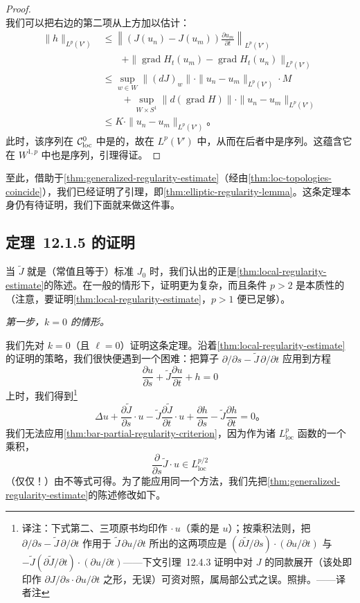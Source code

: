 \begin{proof}
\[\]
我们可以把右边的第二项从上方加以估计：
\[
\begin{aligned}
\|h\|_{L^{p}(V')}&\le\left\|(J(u_{n})-J(u_{m}))\frac{\partial u_{m}}{\partial t}\right\|_{L^{p}(V')}\\
&\qquad+\|\operatorname{grad}H_{t}(u_{m})-\operatorname{grad}H_{t}(u_{n})\|_{L^{p}(V')}\\
&\le\sup_{w\in W}\|(dJ)_{w}\|\cdot\|u_{n}-u_{m}\|_{L^{p}(V')}\cdot M\\
&\qquad+\sup_{W\times S^{1}}\|d(\operatorname{grad}H)\|\cdot\|u_{n}-u_{m}\|_{L^{p}(V')}\\
&\le K\cdot\|u_{n}-u_{m}\|_{L^{p}(V')}\text{。}
\end{aligned}
\]
此时，该序列在 $\mathcal{C}^{0}_{\mathrm{loc}}$ 中是\trConvergence{}的，故在 $L^{p}(V')$ 中\trConvergence，从而在后者中是\trCauchy{}序列。这蕴含它在 $W^{1,p}$ 中也是\trCauchy{}序列，引理得证。
\end{proof}

至此，借助于\cref{thm:generalized-regularity-estimate}（经由\cref{thm:loc-topologies-coincide}），我们已经证明了\trRegularity{}引理，即\cref{thm:elliptic-regularity-lemma}。这条定理本身仍有待证明，我们下面就来做这件事。

\subsection{定理~12.1.5 的证明}
\label{subsec:proof-thm-1215}

当 $\widetilde{J}$ 就是（常值且等于）标准\trComplexStructure{} $J_{0}$ 时，我们认出的正是\cref{thm:local-regularity-estimate}的陈述。在一般的情形下，证明更为复杂，而且条件 $p>2$ 是本质性的（注意，要证明\cref{thm:local-regularity-estimate}，$p>1$ 便已足够）。

\emph{第一步，$k=0$ 的情形。}

我们先对 $k=0$（且 $\ell=0$）证明这条定理。沿着\cref{thm:local-regularity-estimate}的证明的策略，我们很快便遇到一个困难：把算子 $\partial/\partial s-\widetilde{J}\,\partial/\partial t$ 应用到方程
\[
\frac{\partial u}{\partial s}+\widetilde{J}\frac{\partial u}{\partial t}+h=0
\]
上时，我们得到\footnote{译注：下式第二、三项原书均印作 $\cdot\,u$（乘的是 $u$）；按乘积法则，把 $\partial/\partial s-\widetilde{J}\,\partial/\partial t$ 作用于 $\widetilde{J}\,\partial u/\partial t$ 所出的这两项应是 $(\partial\widetilde{J}/\partial s)\cdot(\partial u/\partial t)$ 与 $-\widetilde{J}(\partial\widetilde{J}/\partial t)\cdot(\partial u/\partial t)$——下文引理~12.4.3 证明中对 $J$ 的同款展开（该处即印作 $\partial J/\partial s\cdot\partial u/\partial t$ 之形，无误）可资对照，属局部公式之误。照排。——译者注}
\[
\Delta u+\frac{\partial\widetilde{J}}{\partial s}\cdot u-\widetilde{J}\frac{\partial\widetilde{J}}{\partial t}\cdot u+\frac{\partial h}{\partial s}-\widetilde{J}\frac{\partial h}{\partial t}=0\text{。}
\]
我们无法应用\cref{thm:bar-partial-regularity-criterion}，因为作为诸 $L^{p}_{\mathrm{loc}}$ 函数的一个乘积，
\[
\frac{\partial}{\partial s}\widetilde{J}\cdot u\in L^{p/2}_{\mathrm{loc}}
\]
（仅仅！）由\trHoelder{}不等式可得。为了能应用同一个方法，我们先把\cref{thm:generalized-regularity-estimate}的陈述修改如下。

